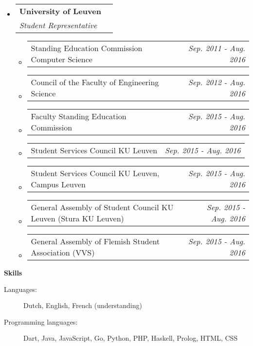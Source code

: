 \documentclass[letterpaper,11pt]{article}
\makeatletter
\newcommand{\resheading}[1]{{\large \colorbox{mygrey}{\begin{minipage}{\textwidth}{\textbf{#1 \vphantom{p\^{E}}}}\end{minipage}}}}
\newcommand{\ressubheading}[4]{
\begin{tabular*}{7.3in}{l@{\extracolsep{\fill}}r}
		\textbf{#1} & #2 \\
		\textit{#3} & \textit{#4} \\
\end{tabular*}\vspace{-6pt}}
\newcommand{\resdateitem}[2]{\item
\begin{tabular*}{6.95in}{l@{\extracolsep{\fill}}r}
		#1 & \textit{#2} \\
\end{tabular*}\vspace{-3pt}}
\makeatother
\begin{document}
\begin{itemize}[leftmargin=*]
\item[]
	\ressubheading{University of Leuven}{ }{Student Representative}{ }
	\begin{itemize}
		\resdateitem{Standing Education Commission Computer Science}{Sep. 2011 - Aug. 2016}
		\resdateitem{Council of the Faculty of Engineering Science}{Sep. 2012 - Aug. 2016}
		\resdateitem{Faculty Standing Education Commission}{Sep. 2015 - Aug. 2016} %
		\resdateitem{Student Services Council KU Leuven}{Sep. 2015 - Aug. 2016}
		\resdateitem{Student Services Council KU Leuven, Campus Leuven}{Sep. 2015 - Aug. 2016}
		\resdateitem{General Assembly of Student Council KU Leuven (Stura KU Leuven)}{Sep. 2015 - Aug. 2016}
		\resdateitem{General Assembly of Flemish Student Association (VVS)}{Sep. 2015 - Aug. 2016}
	\end{itemize}


\end{itemize}


\resheading{Skills}

\begin{description}
\item[Languages:]
Dutch, English, French (understanding)
\item[Programming languages:]
Dart, Java, JavaScript, Go, Python, PHP, Haskell, Prolog, HTML, CSS
\end{description}


%
%
\end{document}
